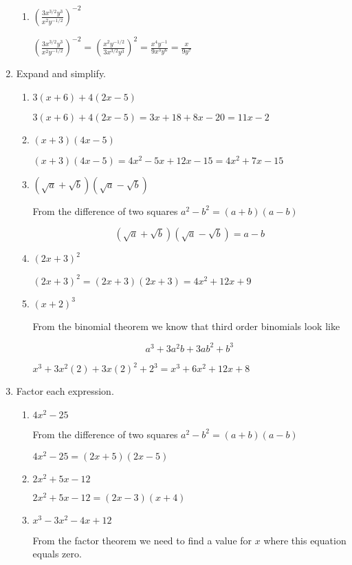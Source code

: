 \documentclass{article}
\begin{document}
\begin{enumerate}
\begin{enumerate}
		\item $(\frac{3x^{3/2}y^{3}}{x^{2}y^{-1/2}})^{-2}$
		
		$(\frac{3x^{3/2}y^{3}}{x^{2}y^{-1/2}})^{-2} = (\frac{x^{2}y^{-1/2}}{3x^{3/2}y^{3}})^{2} = \frac{x^4y^{-1}}{9x^3y^6} = \frac{x}{9y^7}$
	\end{enumerate}
	\item Expand and simplify.
	\begin{enumerate}
		\item $3(x + 6) + 4(2x - 5) $
		
		$ 3(x + 6) + 4(2x - 5) = 3x + 18 + 8x - 20 = 11x - 2 $
		
		\item $(x + 3)(4x - 5)$
		
		$(x + 3)(4x - 5) = 4x^2 - 5x + 12x - 15 = 4x^2 + 7x - 15$
		
		\item $(\sqrt{a} + \sqrt{b})(\sqrt{a} - \sqrt{b})$
		
		From the difference of two squares $a^2 - b^2 = (a + b)(a - b)$
		
		$$ (\sqrt{a} + \sqrt{b})(\sqrt{a} - \sqrt{b}) = a - b $$
		
		\item $(2x + 3)^2$
		
		$(2x + 3)^2 = (2x + 3)(2x + 3) = 4x^2 + 12x + 9$
		
		\item $(x + 2)^3$
		
		From the binomial theorem we know that third order binomials look like
		
		$$ a^3 + 3a^2b + 3ab^2 + b^3 $$
		
		$ x^3 + 3x^2(2) + 3x(2)^2 + 2^3 = x^3 + 6x^2 + 12x + 8 $
	\end{enumerate}
	\item Factor each expression.
	\begin{enumerate}
		\item $4x^2 - 25$
		
		From the difference of two squares $a^2 - b^2 = (a + b)(a - b)$
		
		$4x^2 - 25 = (2x + 5)(2x - 5)$
		
		\item $2x^2 + 5x - 12$
		
		$2x^2 + 5x - 12 = (2x - 3)(x + 4)$
		
		\item $x^3 - 3x^2 - 4x + 12$
		
		From the factor theorem we need to find a value for $x$ where this equation equals zero.
		

\end{enumerate}
\end{enumerate}
\end{document}
